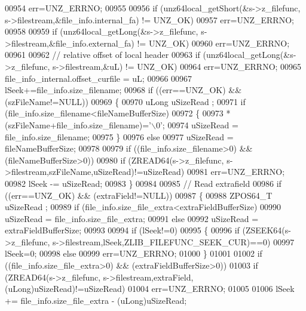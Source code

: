 \begin{DoxyCode}
00954         err=UNZ\_ERRNO;
00955 
00956     \textcolor{keywordflow}{if} (unz64local\_getShort(&s->z\_filefunc, s->filestream,&file\_info.internal\_fa) != UNZ\_OK)
00957         err=UNZ\_ERRNO;
00958 
00959     \textcolor{keywordflow}{if} (unz64local\_getLong(&s->z\_filefunc, s->filestream,&file\_info.external\_fa) != UNZ\_OK)
00960         err=UNZ\_ERRNO;
00961 
00962                 \textcolor{comment}{// relative offset of local header}
00963     \textcolor{keywordflow}{if} (unz64local\_getLong(&s->z\_filefunc, s->filestream,&uL) != UNZ\_OK)
00964         err=UNZ\_ERRNO;
00965     file\_info\_internal.offset\_curfile = uL;
00966 
00967     lSeek+=file\_info.size\_filename;
00968     \textcolor{keywordflow}{if} ((err==UNZ\_OK) && (szFileName!=NULL))
00969     \{
00970         uLong uSizeRead ;
00971         \textcolor{keywordflow}{if} (file\_info.size\_filename<fileNameBufferSize)
00972         \{
00973             *(szFileName+file\_info.size\_filename)=\textcolor{charliteral}{'\(\backslash\)0'};
00974             uSizeRead = file\_info.size\_filename;
00975         \}
00976         \textcolor{keywordflow}{else}
00977             uSizeRead = fileNameBufferSize;
00978 
00979         \textcolor{keywordflow}{if} ((file\_info.size\_filename>0) && (fileNameBufferSize>0))
00980             \textcolor{keywordflow}{if} (ZREAD64(s->z\_filefunc, s->filestream,szFileName,uSizeRead)!=uSizeRead)
00981                 err=UNZ\_ERRNO;
00982         lSeek -= uSizeRead;
00983     \}
00984 
00985     \textcolor{comment}{// Read extrafield}
00986     \textcolor{keywordflow}{if} ((err==UNZ\_OK) && (extraField!=NULL))
00987     \{
00988         ZPOS64\_T uSizeRead ;
00989         \textcolor{keywordflow}{if} (file\_info.size\_file\_extra<extraFieldBufferSize)
00990             uSizeRead = file\_info.size\_file\_extra;
00991         \textcolor{keywordflow}{else}
00992             uSizeRead = extraFieldBufferSize;
00993 
00994         \textcolor{keywordflow}{if} (lSeek!=0)
00995         \{
00996             \textcolor{keywordflow}{if} (ZSEEK64(s->z\_filefunc, s->filestream,lSeek,ZLIB\_FILEFUNC\_SEEK\_CUR)==0)
00997                 lSeek=0;
00998             \textcolor{keywordflow}{else}
00999                 err=UNZ\_ERRNO;
01000         \}
01001 
01002         \textcolor{keywordflow}{if} ((file\_info.size\_file\_extra>0) && (extraFieldBufferSize>0))
01003             \textcolor{keywordflow}{if} (ZREAD64(s->z\_filefunc, s->filestream,extraField,(uLong)uSizeRead)!=uSizeRead)
01004                 err=UNZ\_ERRNO;
01005 
01006         lSeek += file\_info.size\_file\_extra - (uLong)uSizeRead;

\end{DoxyCode}
